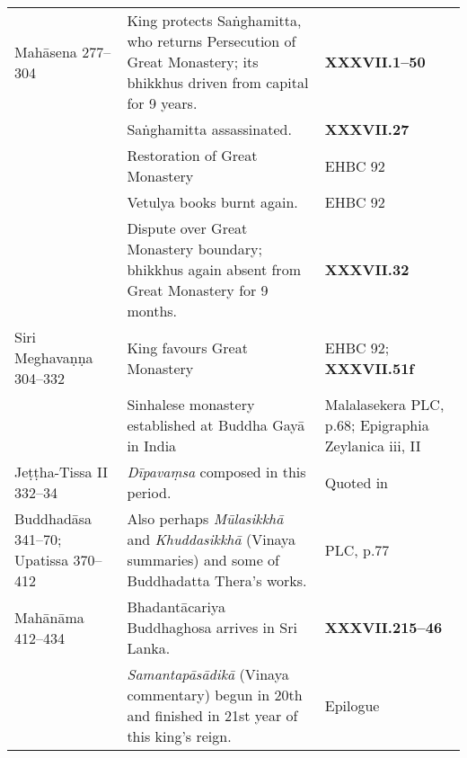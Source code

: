 \begin{tabular}{l|l|l}
    Mahāsena 277–304 & King protects Saṅghamitta, who returns Persecution of Great Monastery; its  bhikkhus driven from capital for 9 years.  & \textbf{\cite{Mhv} XXXVII.1–50}\\
     & Saṅghamitta assassinated. & \textbf{\cite{Mhv} XXXVII.27}\\
     &  Restoration of Great Monastery  & EHBC 92\\
     & Vetulya books burnt again.  & EHBC 92\\
     & Dispute over Great Monastery boundary; bhikkhus again absent from Great Monastery for 9 months. & \textbf{\cite{Mhv} XXXVII.32}\\
    Siri Meghavaṇṇa 304–332   & King favours Great Monastery & EHBC 92; \textbf{\cite{Mhv} XXXVII.51f}  \\
     & Sinhalese monastery established at Buddha Gayā in India & Malalasekera PLC, p.68; Epigraphia Zeylanica iii, II\\
    Jeṭṭha-Tissa II 332–34 & \emph{Dīpavaṃsa} composed in this period. & Quoted in \textbf{\cite{Vin-a}}\\
    Buddhadāsa 341–70; Upatissa  370–412   & Also perhaps \emph{Mūlasikkhā} and \emph{Khuddasikkhā} (Vinaya summaries) and some of Buddhadatta Thera’s works. & PLC, p.77\\
    Mahānāma 412–434 & Bhadantācariya Buddhaghosa arrives in Sri Lanka.   & \textbf{\cite{Mhv} XXXVII.215–46} \\
     & \emph{Samantapāsādikā} (Vinaya commentary) begun in 20th and finished in 21st year of this king’s reign. & \textbf{\cite{Vin-a}} Epilogue
\end{tabular}
\else
